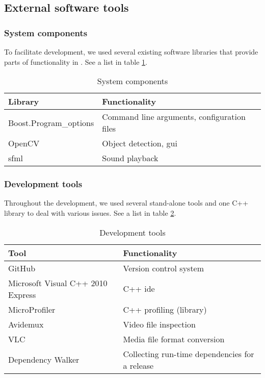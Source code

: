 

\subsection{External software tools}
\subsubsection{System components} \label{sec:systemcomponents}

To facilitate development, we used several existing software libraries
that provide parts of functionality in \slnkcctr{}.
See a list in table \ref{tab:systemcomponents}.

\begin{table}[h]
\centering
\begin{tabularx}{\linewidth}{X|X}
Library & Functionality \\
\hline
\hline
Boost.\allowbreak{}Program\_\allowbreak{}options
& Command line ar\-gu\-ments, configuration files \\
\hline
OpenCV & Object detection, \gls{gui} \\
\hline
\gls{sfml} & Sound playback
\end{tabularx}
\caption{System components}
\label{tab:systemcomponents}
\end{table}

\subsubsection{Development tools}

Throughout the development, we used several stand-alone tools
and one C++ library to deal with various issues.
See a list in table \ref{tab:devtools}.

\begin{table}[h]
\centering
\begin{tabularx}{\linewidth}{X|X}
Tool & Functionality \\
\hline
\hline
GitHub & Version control system \\
\hline
Microsoft Visual C++ 2010 Express & C++ \gls{ide} \\
\hline
MicroProfiler & C++ profiling (library) \\
\hline
Avidemux & Video file inspection \\
\hline
VLC & Media file format conversion \\
\hline
Dependency Walker & Collecting run-time dependencies for a release
\end{tabularx}
\caption{Development tools}
\label{tab:devtools}
\end{table}
